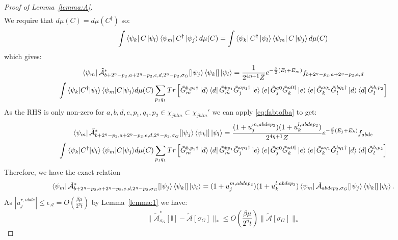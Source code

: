 \documentclass[aps,floatfix,10pt,amssymb,amsfont,amsmath,superscriptaddress,float,nofootinbib,longbibliography,nobalancelastpage,twocolumn]{revtex4-2}
\begin{document}
\begin{proof}[Proof of Lemma~\ref{lemma:A}]
\begin{multline}
\end{multline}
We require that $d\mu(C) = d\mu(C^{\dagger})$ so:
\begin{equation}
    \int  \bra{\psi_k}C\ket{\psi_{l}}\bra{\psi_m}C^{\dagger} \ket{\psi_j} d\mu(C) = \int  \bra{\psi_k}C^{\dagger}\ket{\psi_{l}}\bra{\psi_m}C \ket{\psi_j} d\mu(C)
\end{equation}
which gives:
\begin{multline}
 \bra{\psi_m}\tilde{\mathcal{A}}^*_{b+2^{\eta}-p_2,a+2^{\eta}-p_2,e,d,2^{\eta}-p_2,\sigma_G}[\ket{\psi_j}\bra{\psi_k}]\ket{\psi_l}  = \frac{1}{2^{4\eta+1}Z} e^{-\frac{\beta}{2}(E_l+E_m)}{f_{b+2^{\eta}-p_2,a+2^{\eta}-p_2,e,d}} \\\int {\braket{\psi_k|C^{\dagger}|\psi_l}\braket{\psi_m|C|\psi_j}} d\mu(C)\sum_{p_1q_1} Tr\left[ {\tilde G_m^{b, p_2\dagger}\ket{d}\bra{d}\tilde G_m^{bp_1}} {\tilde G^{ap_1\dagger}_j\ket{e}\bra{e}\tilde G^{a0}_j } \tilde G^{a0\dagger}_k\ket{e}\bra{e}\tilde G^{aq_1}_k \tilde G_l^{bq_1\dagger}\ket{d}\bra{d}\tilde G_l^{b,p_2}\right]
\end{multline}
As the RHS is only non-zero for $a,b,d,e,p_1,q_1,p_2 \in \chi_{jklm} \subset \chi_{jklm}'$ we can apply \eqref{eq:fabtofba} to get:
\begin{multline}
\bra{\psi_m}\tilde{\mathcal{A}}^*_{b+2^{\eta}-p_2,a+2^{\eta}-p_2,e,d,2^{\eta}-p_2,\sigma_G}[\ket{\psi_j}\bra{\psi_k}]\ket{\psi_l} 
   = \frac{(1+u_j^{m,abdep_2})(1+u_k^{l,abdep_2})}{2^{4\eta+1}Z}   e^{-\frac{\beta}{2}(E_j+E_k)}{f_{abde}}  \\\int {\braket{\psi_k|C^{\dagger}|\psi_l}\braket{\psi_m|C|\psi_j}} d\mu(C)\sum_{p_1q_1}Tr\left[ {\tilde G_m^{b, p_2\dagger}\ket{d}\bra{d}\tilde G_m^{bp_1}} {\tilde G^{ap_1\dagger}_j\ket{e}\bra{e}\tilde G^{a0}_j } \tilde G^{a0\dagger}_k\ket{e}\bra{e}\tilde G^{aq_1}_k \tilde G_l^{bq_1\dagger}\ket{d}\bra{d}\tilde G_l^{b,p_2}\right]
\end{multline}
Therefore, we have the exact relation
\begin{equation}
  \bra{\psi_m}\tilde{\mathcal{A}}^*_{b+2^{\eta}-p_2,a+2^{\eta}-p_2,e,d,2^{\eta}-p_2,\sigma_G}[\ket{\psi_j}\bra{\psi_k}]\ket{\psi_l} 
   =(1+u_j^{m,abdep_2})(1+u_k^{l,abdep_2})\bra{\psi_m}\tilde{\mathcal{A}}_{abdep_2,\sigma_G}[\ket{\psi_j}\bra{\psi_k}]\ket{\psi_l}.
\end{equation}
As $|u_j^{r,abde}| \leq \epsilon_{\mathcal{A}} = O(\frac{\beta \mu}{2^{\eta}t})$ by Lemma~\ref{lemma:1}  we have:
\begin{equation}
    \|\tilde{\mathcal{A}}^*_{\sigma_G}[\mathbb{I}] - \tilde{\mathcal{A}}[\sigma_G]\|_* \leq O\left(\frac{\beta \mu}{2^{\eta}t}\right)\|\tilde{\mathcal{A}}[\sigma_G]\|_*

\end{equation}
\end{proof}
\end{document}
